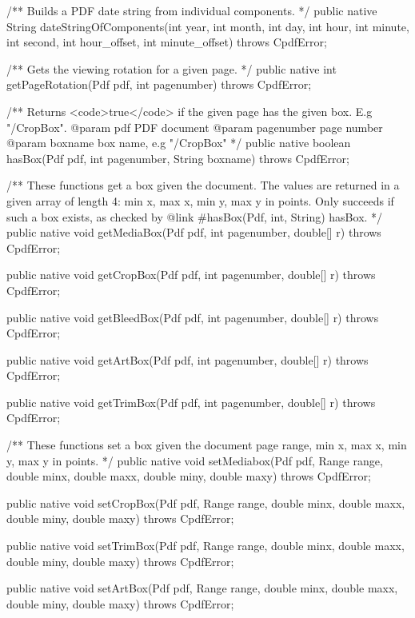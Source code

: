 /** Builds a PDF date string from individual components. */
public native String dateStringOfComponents(int year, int month, int day,
                                            int hour, int minute,
                                            int second, int hour_offset,
                                            int minute_offset)
    throws CpdfError;

/** Gets the viewing rotation for a given page. */
public native int getPageRotation(Pdf pdf, int pagenumber)
    throws CpdfError;

/** Returns <code>true</code> if the given page has the given box. E.g
"/CropBox".
@param pdf PDF document
@param pagenumber page number
@param boxname box name, e.g "/CropBox" */
public native boolean hasBox(Pdf pdf, int pagenumber, String boxname)
    throws CpdfError;

/** These functions get a box given the document. The values are returned
in a given array of length 4: min x, max x, min y, max y in points. Only
succeeds if such a box exists, as checked by {@link #hasBox(Pdf, int,
String) hasBox}. */
public native void getMediaBox(Pdf pdf, int pagenumber, double[] r)
    throws CpdfError;

public native void getCropBox(Pdf pdf, int pagenumber, double[] r)
    throws CpdfError;

public native void getBleedBox(Pdf pdf, int pagenumber, double[] r)
    throws CpdfError;

public native void getArtBox(Pdf pdf, int pagenumber, double[] r)
    throws CpdfError;

public native void getTrimBox(Pdf pdf, int pagenumber, double[] r)
    throws CpdfError;

/** These functions set a box given the document page range, min x, max x,
min y, max y in points. */
public native void setMediabox(Pdf pdf, Range range, double minx,
                               double maxx, double miny, double maxy)
    throws CpdfError;

public native void setCropBox(Pdf pdf, Range range, double minx,
                              double maxx, double miny, double maxy)
    throws CpdfError;

public native void setTrimBox(Pdf pdf, Range range, double minx,
                              double maxx, double miny, double maxy)
    throws CpdfError;

public native void setArtBox(Pdf pdf, Range range, double minx,
                             double maxx, double miny, double maxy)
    throws CpdfError;

